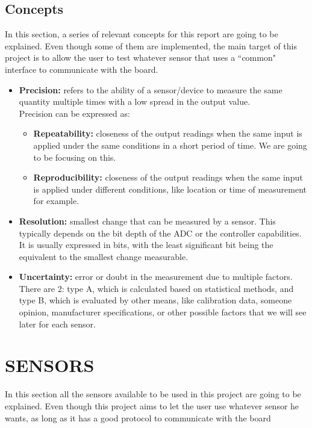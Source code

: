 \documentclass[14pt]{article}
\begin{document}
\begin{normalsize}
		\subsection{Concepts}
		In this section, a series of relevant concepts for this report are going to be explained. Even though some of them are implemented, the main target of this project is to allow the user to test whatever sensor that uses a ``common" interface to communicate with the board.
			\begin{itemize}
				\item \textbf{Precision:} refers to the ability of a sensor/device to measure the same quantity multiple times with a low spread in the output value.\\
				Precision can be expressed as:
				\begin{itemize}
					\item \textbf{Repeatability:} closeness of the output readings when the same input is applied under the same conditions in a short period of time. We are going to be focusing on this.
					\item \textbf{Reproducibility:} closeness of the output readings when the same input is applied under different conditions, like location or time of measurement for example.
				\end{itemize}
				\item \textbf{Resolution:} smallest change that can be measured by a sensor. This typically depends on the bit depth of the ADC or the controller capabilities. It is usually expressed in bits, with the least significant bit being the equivalent to the smallest change measurable.\\
				\item \textbf{Uncertainty:} error or doubt in the measurement due to multiple factors. There are 2: type A, which is calculated based on statistical methods, and type B, which is evaluated by other means, like calibration data, someone opinion, manufacturer specifications, or other possible factors that we will see later for each sensor.
			\end{itemize}
	\end{normalsize}
	\newpage
	\section{SENSORS}
		\begin{normalsize}
			In this section all the sensors available to be used in this project are going to be explained. Even though this project aims to let the user use whatever sensor he wants, as long as it has a good protocol to communicate with the board%
		\end{normalsize}
		
\end{document}
